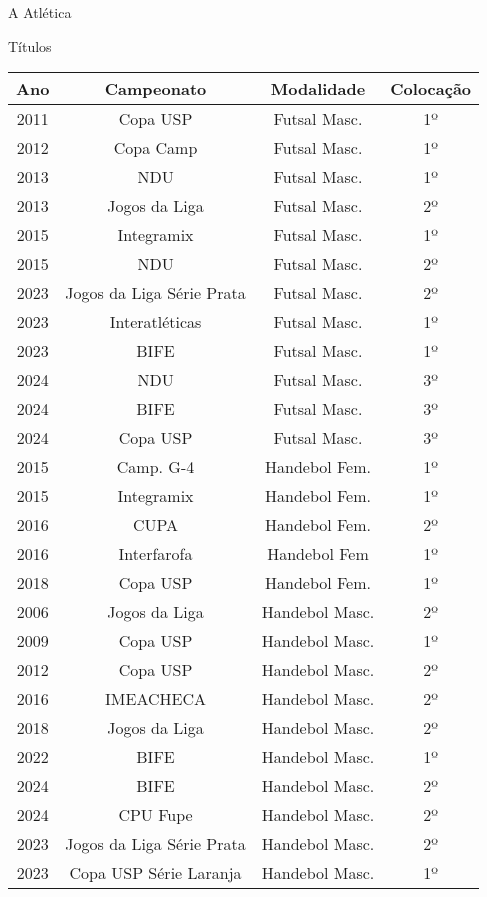 \begin{secao}{A Atlética}
\begin{subsecao}{Títulos}
\begin{center}
\begin{tabular}{|c|c|c|c|}
  \hline
  Ano & Campeonato & Modalidade & Colocação\\
  \hline
    2011 & Copa USP       & Futsal Masc.    & 1º\\
    2012 & Copa Camp      & Futsal Masc.    & 1º\\
    2013 & NDU            & Futsal Masc.    & 1º\\
    2013 & Jogos da Liga  & Futsal Masc.    & 2º\\
    2015 & Integramix     & Futsal Masc.    & 1º\\
    2015 & NDU            & Futsal Masc.    & 2º\\
    2023 & Jogos da Liga Série Prata & Futsal Masc. & 2º\\
    2023 & Interatléticas & Futsal Masc.    & 1º\\
    2023 & BIFE           & Futsal Masc.    & 1º\\
    2024 & NDU            & Futsal Masc.    & 3º\\
    2024 & BIFE           & Futsal Masc.    & 3º\\
    2024 & Copa USP       & Futsal Masc.    & 3º\\
    2015 & Camp. G-4      & Handebol Fem.   & 1º\\
    2015 & Integramix     & Handebol Fem.   & 1º\\
    2016 & CUPA           & Handebol Fem.   & 2º\\
    2016 & Interfarofa    & Handebol Fem    & 1º\\
    2018 & Copa USP       & Handebol Fem.   & 1º\\
    2006 & Jogos da Liga  & Handebol Masc.  & 2º\\
    2009 & Copa USP       & Handebol Masc.  & 1º\\
    2012 & Copa USP       & Handebol Masc.  & 2º\\
    2016 & IMEACHECA      & Handebol Masc.  & 2º\\
    2018 & Jogos da Liga  & Handebol Masc.  & 2º\\
    2022 & BIFE           & Handebol Masc.  & 1º\\
    2024 & BIFE           & Handebol Masc.  & 2º\\
    2024 & CPU Fupe       & Handebol Masc.  & 2º\\
    2023 & Jogos da Liga Série Prata & Handebol Masc. & 2º\\
    2023 & Copa USP Série Laranja & Handebol Masc.  & 1º\\

\end{tabular}
\end{center}
\end{subsecao}
\end{secao}

